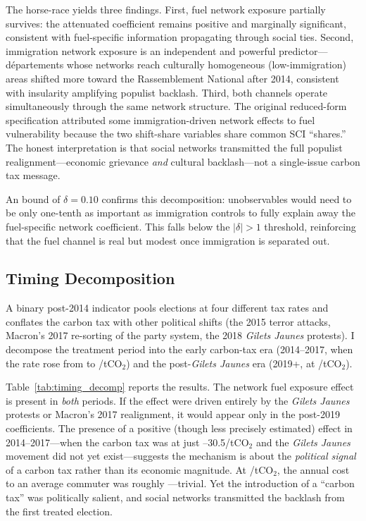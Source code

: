 \documentclass[12pt]{article}
\providecommand{\euro}{\texteuro}
\newcommand{\rn}{Rassemblement National}
\newcommand{\gj}{\textit{Gilets Jaunes}}
\newcommand{\depts}{d\'{e}partements}
\begin{document}
The horse-race yields three findings. First, fuel network exposure partially survives: the attenuated coefficient remains positive and marginally significant, consistent with fuel-specific information propagating through social ties. Second, immigration network exposure is an independent and powerful predictor---\depts{} whose networks reach culturally homogeneous (low-immigration) areas shifted more toward the \rn{} after 2014, consistent with insularity amplifying populist backlash. Third, both channels operate simultaneously through the same network structure. The original reduced-form specification attributed some immigration-driven network effects to fuel vulnerability because the two shift-share variables share common SCI ``shares.'' The honest interpretation is that social networks transmitted the full populist realignment---economic grievance \emph{and} cultural backlash---not a single-issue carbon tax message.

An \citet{oster2019unobservable} bound of $\delta = 0.10$ confirms this decomposition: unobservables would need to be only one-tenth as important as immigration controls to fully explain away the fuel-specific network coefficient. This falls below the $|\delta| > 1$ threshold, reinforcing that the fuel channel is real but modest once immigration is separated out.

\subsection{Timing Decomposition}
\label{sec:timing}

A binary post-2014 indicator pools elections at four different tax rates and conflates the carbon tax with other political shifts (the 2015 terror attacks, Macron's 2017 re-sorting of the party system, the 2018 \gj{} protests). I decompose the treatment period into the early carbon-tax era (2014--2017, when the rate rose from \euro 7 to \euro 30.5/tCO$_2$) and the post-\gj{} era (2019+, at \euro 44.6/tCO$_2$).



Table~\ref{tab:timing_decomp} reports the results. The network fuel exposure effect is present in \emph{both} periods. If the effect were driven entirely by the \gj{} protests or Macron's 2017 realignment, it would appear only in the post-2019 coefficients. The presence of a positive (though less precisely estimated) effect in 2014--2017---when the carbon tax was at just \euro 7--30.5/tCO$_2$ and the \gj{} movement did not yet exist---suggests the mechanism is about the \emph{political signal} of a carbon tax rather than its economic magnitude. At \euro 7/tCO$_2$, the annual cost to an average commuter was roughly \euro 20---trivial. Yet the introduction of a ``carbon tax'' was politically salient, and social networks transmitted the backlash from the first treated election.
\end{document}
